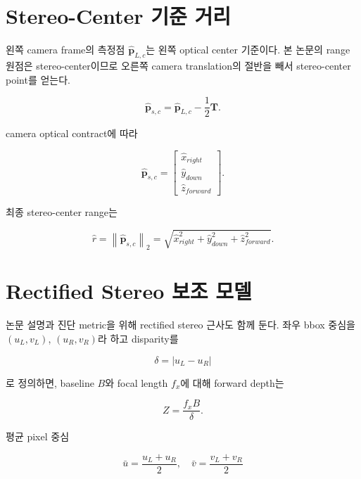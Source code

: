\documentclass[10pt,conference]{IEEEtran}
\newcommand{\vect}[1]{\bm{#1}}
\newcommand{\norm}[1]{\left\lVert #1 \right\rVert_2}
\begin{document}
\section{Stereo-Center 기준 거리}

왼쪽 camera frame의 측정점 $\hat{\vect{p}}_{L,c}$는 왼쪽 optical center 기준이다.
본 논문의 range 원점은 stereo-center이므로 오른쪽 camera translation의 절반을 빼서 stereo-center point를 얻는다.

\begin{equation}
\hat{\vect{p}}_{s,c}
=
\hat{\vect{p}}_{L,c}
-
\frac{1}{2}\vect{T}.
\label{eq:stereo_center_point}
\end{equation}

camera optical contract에 따라

\begin{equation}
\hat{\vect{p}}_{s,c}
=
\begin{bmatrix}
\hat{x}_{right} \\
\hat{y}_{down} \\
\hat{z}_{forward}
\end{bmatrix}.
\end{equation}

최종 stereo-center range는

\begin{equation}
\hat{r} = \norm{\hat{\vect{p}}_{s,c}}
=
\sqrt{
\hat{x}_{right}^2+
\hat{y}_{down}^2+
\hat{z}_{forward}^2
}.
\label{eq:range}
\end{equation}

\section{Rectified Stereo 보조 모델}

논문 설명과 진단 metric을 위해 rectified stereo 근사도 함께 둔다.
좌우 bbox 중심을 $(u_L,v_L)$, $(u_R,v_R)$라 하고 disparity를

\begin{equation}
\delta = |u_L-u_R|
\end{equation}

로 정의하면, baseline $B$와 focal length $f_x$에 대해 forward depth는

\begin{equation}
Z = \frac{f_xB}{\delta}.
\label{eq:rectified_depth}
\end{equation}

평균 pixel 중심

\begin{equation}
\bar{u}=\frac{u_L+u_R}{2},
\quad
\bar{v}=\frac{v_L+v_R}{2}
\end{equation}
\end{document}
